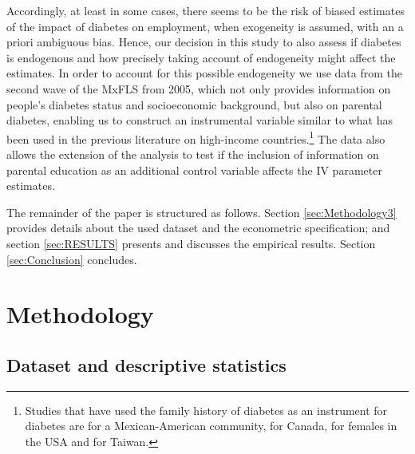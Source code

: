 Accordingly, at least in some cases, there seems to be the
risk of biased estimates of the impact of diabetes on employment,
when exogeneity is assumed, with an a priori ambiguous bias. Hence,
our decision in this study to also assess if diabetes is endogenous
and how precisely taking account of endogeneity might affect the estimates.
  In order to account for this possible endogeneity we use data from
the second wave of the \acf{MxFLS} from 2005, which not only provides
information on people\textquoteright s diabetes status and socioeconomic
background, but also on parental diabetes, enabling us to construct
an instrumental variable similar to what has been used in the previous
literature on high-income countries.\footnote{Studies that have used the family history of diabetes as an instrument
for diabetes are \textcite{Brown2005} for a Mexican-American community,
\textcite{Latif2009} for Canada, \textcite{Minor2011} for females in
the USA and \textcite{Lin2011b} for Taiwan.} The data also allows the extension of the analysis to test if the
inclusion of information on parental education as an additional control
variable affects the \ac{IV} parameter estimates.

The remainder of the paper is structured as follows. Section
\ref{sec:Methodology3} provides details about the used dataset and
the econometric specification; and section \ref{sec:RESULTS} presents
and discusses the empirical results. Section \ref{sec:Conclusion}
concludes.



\section{\label{sec:Methodology3}Methodology}


\subsection{\label{sub:Data}Dataset and descriptive statistics}

